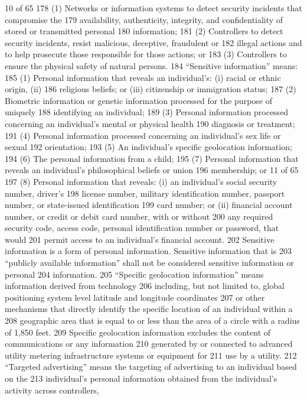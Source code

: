 10 of 65
178 (1) Networks or information systems to detect security incidents that compromise the
179 availability, authenticity, integrity, and confidentiality of stored or transmitted personal
180 information;
181 (2) Controllers to detect security incidents, resist malicious, deceptive, fraudulent or
182 illegal actions and to help prosecute those responsible for those actions; or
183 (3) Controllers to ensure the physical safety of natural persons.
184 “Sensitive information” means:
185 (1) Personal information that reveals an individual’s: (i) racial or ethnic origin, (ii)
186 religious beliefs; or (iii) citizenship or immigration status;
187 (2) Biometric information or genetic information processed for the purpose of uniquely
188 identifying an individual;
189 (3) Personal information processed concerning an individual’s mental or physical health
190 diagnosis or treatment;
191 (4) Personal information processed concerning an individual’s sex life or sexual
192 orientation;
193 (5) An individual’s specific geolocation information;
194 (6) The personal information from a child;
195 (7) Personal information that reveals an individual’s philosophical beliefs or union
196 membership; or
11 of 65
197 (8) Personal information that reveals: (i) an individual’s social security number, driver’s
198 license number, military identification number, passport number, or state-issued identification
199 card number; or (ii) financial account number, or credit or debit card number, with or without
200 any required security code, access code, personal identification number or password, that would
201 permit access to an individual’s financial account.
202 Sensitive information is a form of personal information. Sensitive information that is
203 “publicly available information” shall not be considered sensitive information or personal
204 information.
205 “Specific geolocation information” means information derived from technology
206 including, but not limited to, global positioning system level latitude and longitude coordinates
207 or other mechanisms that directly identify the specific location of an individual within a
208 geographic area that is equal to or less than the area of a circle with a radius of 1,850 feet.
209 Specific geolocation information excludes the content of communications or any information
210 generated by or connected to advanced utility metering infrastructure systems or equipment for
211 use by a utility.
212 “Targeted advertising” means the targeting of advertising to an individual based on the
213 individual’s personal information obtained from the individual’s activity across controllers,
